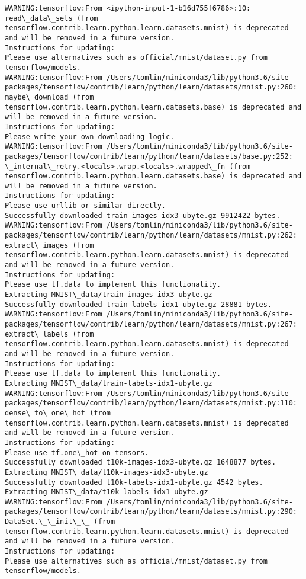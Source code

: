 \documentclass[11pt]{article}
\begin{document}
    \begin{Verbatim}[commandchars=\\\{\}]
WARNING:tensorflow:From <ipython-input-1-b16d755f6786>:10: read\_data\_sets (from tensorflow.contrib.learn.python.learn.datasets.mnist) is deprecated and will be removed in a future version.
Instructions for updating:
Please use alternatives such as official/mnist/dataset.py from tensorflow/models.
WARNING:tensorflow:From /Users/tomlin/miniconda3/lib/python3.6/site-packages/tensorflow/contrib/learn/python/learn/datasets/mnist.py:260: maybe\_download (from tensorflow.contrib.learn.python.learn.datasets.base) is deprecated and will be removed in a future version.
Instructions for updating:
Please write your own downloading logic.
WARNING:tensorflow:From /Users/tomlin/miniconda3/lib/python3.6/site-packages/tensorflow/contrib/learn/python/learn/datasets/base.py:252: \_internal\_retry.<locals>.wrap.<locals>.wrapped\_fn (from tensorflow.contrib.learn.python.learn.datasets.base) is deprecated and will be removed in a future version.
Instructions for updating:
Please use urllib or similar directly.
Successfully downloaded train-images-idx3-ubyte.gz 9912422 bytes.
WARNING:tensorflow:From /Users/tomlin/miniconda3/lib/python3.6/site-packages/tensorflow/contrib/learn/python/learn/datasets/mnist.py:262: extract\_images (from tensorflow.contrib.learn.python.learn.datasets.mnist) is deprecated and will be removed in a future version.
Instructions for updating:
Please use tf.data to implement this functionality.
Extracting MNIST\_data/train-images-idx3-ubyte.gz
Successfully downloaded train-labels-idx1-ubyte.gz 28881 bytes.
WARNING:tensorflow:From /Users/tomlin/miniconda3/lib/python3.6/site-packages/tensorflow/contrib/learn/python/learn/datasets/mnist.py:267: extract\_labels (from tensorflow.contrib.learn.python.learn.datasets.mnist) is deprecated and will be removed in a future version.
Instructions for updating:
Please use tf.data to implement this functionality.
Extracting MNIST\_data/train-labels-idx1-ubyte.gz
WARNING:tensorflow:From /Users/tomlin/miniconda3/lib/python3.6/site-packages/tensorflow/contrib/learn/python/learn/datasets/mnist.py:110: dense\_to\_one\_hot (from tensorflow.contrib.learn.python.learn.datasets.mnist) is deprecated and will be removed in a future version.
Instructions for updating:
Please use tf.one\_hot on tensors.
Successfully downloaded t10k-images-idx3-ubyte.gz 1648877 bytes.
Extracting MNIST\_data/t10k-images-idx3-ubyte.gz
Successfully downloaded t10k-labels-idx1-ubyte.gz 4542 bytes.
Extracting MNIST\_data/t10k-labels-idx1-ubyte.gz
WARNING:tensorflow:From /Users/tomlin/miniconda3/lib/python3.6/site-packages/tensorflow/contrib/learn/python/learn/datasets/mnist.py:290: DataSet.\_\_init\_\_ (from tensorflow.contrib.learn.python.learn.datasets.mnist) is deprecated and will be removed in a future version.
Instructions for updating:
Please use alternatives such as official/mnist/dataset.py from tensorflow/models.

    \end{Verbatim}
\end{document}
